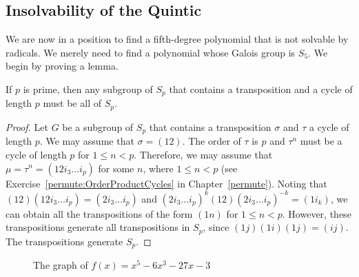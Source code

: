  
 	   
\subsection*{Insolvability of the Quintic}
 

We are now in a position to find a fifth-degree polynomial that is not
solvable by radicals.  We merely need to find a polynomial whose
Galois group is $S_5$. We begin by proving a lemma.


\begin{lemma}\label{galois:Sn_generating_lemma}
If $p$ is prime, then any subgroup of $S_p$ that contains a transposition and a cycle of length
$p$ must be all of $S_p$. 
\end{lemma}
 
 
\begin{proof}
Let $G$ be a subgroup of $S_p$ that contains a transposition $\sigma$
and $\tau$ a cycle of length $p$.  We may assume that $\sigma = (1 2)$.  The order of $\tau$ is $p$ and $\tau^n$ must be a cycle of length $p$ for $1 \leq n < p$.  Therefore, we may assume that $\mu = \tau^n = (1 2 i_3 \ldots i_p)$ for some $n$, where $1 \leq n < p$ (see Exercise~\ref{permute:OrderProductCycles} in Chapter~\ref{permute}).
Noting that $(1 2)(12 i_3\ldots i_p) = (2 i_3\ldots i_p)$
and $(2i_3 \ldots i_p)^k(12)(2i_3 \ldots i_p)^{-k} = (1i_k)$, we can obtain all
the transpositions of the form $(1n)$ for $1 \leq n < p$. However, these
transpositions generate all transpositions in $S_p$, since $(1j)(1 i)(1
j) = (i j)$.  The transpositions generate $S_p$. 
\end{proof}
 
 
\medskip
\begin{figure}
\begin{center}


\end{center}
\caption{The graph of $f(x) = x^5 - 6 x^3 - 27 x - 3$}
\label{Galois4}
\end{figure}

